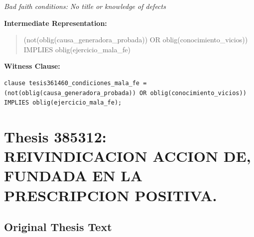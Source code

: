 \documentclass[11pt,a4paper]{article}
\begin{document}
\textit{Bad faith conditions: No title or knowledge of defects}

\textbf{Intermediate Representation:}

\begin{quote}
(not(oblig(causa\_generadora\_probada)) OR oblig(conocimiento\_vicios)) IMPLIES oblig(ejercicio\_mala\_fe)
\end{quote}

\textbf{Witness Clause:}

\begin{lstlisting}[style=witnessstyle, language=Witness]
clause tesis361460_condiciones_mala_fe = (not(oblig(causa_generadora_probada)) OR oblig(conocimiento_vicios)) IMPLIES oblig(ejercicio_mala_fe);
\end{lstlisting}

\newpage

\section{Thesis 385312: REIVINDICACION ACCION DE, FUNDADA EN LA PRESCRIPCION POSITIVA.}
\label{thesis:385312}

\subsection{Original Thesis Text}
\end{document}
